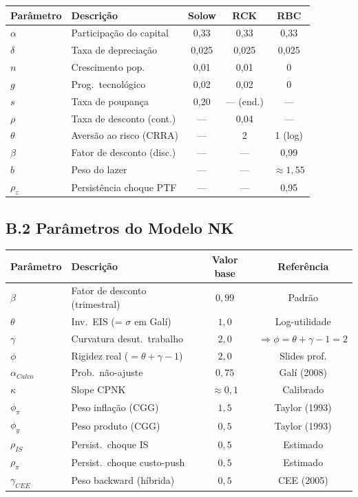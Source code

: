 \documentclass[12pt, a4paper]{article}
\begin{document}
\begin{center}
\begin{tabular}{llccc}
\toprule
Parâmetro & Descrição & Solow & RCK & RBC \\
\midrule
$\alpha$ & Participação do capital & 0,33 & 0,33 & 0,33 \\
$\delta$ & Taxa de depreciação & 0,025 & 0,025 & 0,025 \\
$n$ & Crescimento pop.\ & 0,01 & 0,01 & 0 \\
$g$ & Prog.\ tecnológico & 0,02 & 0,02 & 0 \\
$s$ & Taxa de poupança & 0,20 & --- (end.) & --- \\
$\rho$ & Taxa de desconto (cont.) & --- & 0,04 & --- \\
$\theta$ & Aversão ao risco (CRRA) & --- & 2 & 1 (log) \\
$\beta$ & Fator de desconto (disc.) & --- & --- & 0,99 \\
$b$ & Peso do lazer & --- & --- & $\approx 1{,}55$ \\
$\rho_z$ & Persistência choque PTF & --- & --- & 0,95 \\
\bottomrule
\end{tabular}
\end{center}

\subsection*{B.2 Parâmetros do Modelo NK}

\begin{center}
\begin{tabular}{llcc}
\toprule
Parâmetro & Descrição & Valor base & Referência \\
\midrule
$\beta$ & Fator de desconto (trimestral) & $0{,}99$ & Padrão \\
$\theta$ & Inv.\ EIS (= $\sigma$ em Galí) & $1{,}0$ & Log-utilidade \\
$\gamma$ & Curvatura desut.\ trabalho & $2{,}0$ & $\Rightarrow \phi = \theta+\gamma-1 = 2$ \\
$\phi$ & Rigidez real ($=\theta+\gamma-1$) & $2{,}0$ & Slides prof. \\
$\alpha_{Calvo}$ & Prob.\ não-ajuste & $0{,}75$ & Galí (2008) \\
$\kappa$ & Slope CPNK & $\approx 0{,}1$ & Calibrado \\
$\phi_\pi$ & Peso inflação (CGG) & $1{,}5$ & Taylor (1993) \\
$\phi_y$ & Peso produto (CGG) & $0{,}5$ & Taylor (1993) \\
$\rho_{IS}$ & Persist.\ choque IS & $0{,}5$ & Estimado \\
$\rho_\pi$ & Persist.\ choque custo-push & $0{,}5$ & Estimado \\
$\gamma_{CEE}$ & Peso backward (híbrida) & $0{,}5$ & CEE (2005) \\
\bottomrule
\end{tabular}
\end{center}
\end{document}
